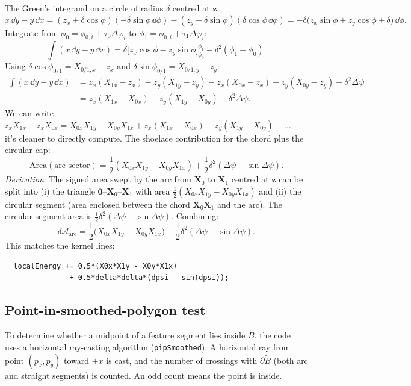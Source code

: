 \documentclass[12pt]{article}
\begin{document}
The Green's integrand on a circle of radius $\delta$ centred at $\mathbf{z}$:
\[
  x\,\dd y - y\,\dd x = (z_x + \delta\cos\phi)(-\delta\sin\phi\,\dd\phi)
    - (z_y + \delta\sin\phi)(\delta\cos\phi\,\dd\phi)
  = -\delta\bigl(z_x\sin\phi + z_y\cos\phi + \delta\bigr)\,\dd\phi.
\]
Integrate from $\phi_0 = \phi_{0,i} + \tau_0\Delta\varphi_i$ to
$\phi_1 = \phi_{0,i} + \tau_1\Delta\varphi_i$:
\[
  \int (x\,\dd y - y\,\dd x)
    = \delta\bigl[z_x\cos\phi - z_y\sin\phi\bigr]_{\phi_0}^{\phi_1}
    - \delta^2(\phi_1 - \phi_0).
\]
Using $\delta\cos\phi_{0/1} = X_{0/1,x} - z_x$ and $\delta\sin\phi_{0/1} = X_{0/1,y} - z_y$:
\begin{align*}
  \int (x\,\dd y - y\,\dd x)
  &= z_x(X_{1x}-z_x) - z_y(X_{1y}-z_y) - z_x(X_{0x}-z_x) + z_y(X_{0y}-z_y)
     - \delta^2\Delta\psi \\
  &= z_x(X_{1x} - X_{0x}) - z_y(X_{1y} - X_{0y}) - \delta^2\Delta\psi.
\end{align*}
We can write $z_x X_{1x} - z_x X_{0x} = X_{0x}X_{1y} - X_{0y}X_{1x}
+ z_x(X_{1x}-X_{0x}) - z_y(X_{1y}-X_{0y}) + \ldots$ — it's cleaner to
directly compute.  The shoelace contribution for the chord plus the circular cap:
\[
  \mathrm{Area}(\text{arc sector}) = \frac{1}{2}(X_{0x}X_{1y} - X_{0y}X_{1x})
  + \frac{1}{2}\delta^2(\Delta\psi - \sin\Delta\psi).
\]
\emph{Derivation}: The signed area swept by the arc from $\mathbf{X}_0$ to $\mathbf{X}_1$
centred at $\mathbf{z}$ can be split into (i) the triangle $\mathbf{0}$–$\mathbf{X}_0$–$\mathbf{X}_1$
with area $\frac{1}{2}(X_{0x}X_{1y}-X_{0y}X_{1x})$ and (ii) the circular
segment (area enclosed between the chord $\mathbf{X}_0\mathbf{X}_1$ and the arc).
The circular segment area is $\frac{1}{2}\delta^2(\Delta\psi - \sin\Delta\psi)$.
Combining:
\[
  \boxed{
  \delta\mathcal{A}_{\mathrm{arc}} = \frac{1}{2}\bigl(X_{0x}X_{1y} - X_{0y}X_{1x}\bigr)
  + \frac{1}{2}\delta^2(\Delta\psi - \sin\Delta\psi).
  }
\]
This matches the kernel lines:
\begin{verbatim}
  localEnergy += 0.5*(X0x*X1y - X0y*X1x)
               + 0.5*delta*delta*(dpsi - sin(dpsi));
\end{verbatim}

\subsection{Point-in-smoothed-polygon test}

To determine whether a midpoint of a feature segment lies inside $\tilde B$, the
code uses a horizontal ray-casting algorithm (\texttt{pipSmoothed}).  A horizontal
ray from point $(p_x, p_y)$ toward $+x$ is cast, and the number of crossings with
$\partial\tilde B$ (both arc and straight segments) is counted.  An odd count means
the point is inside.
\end{document}
